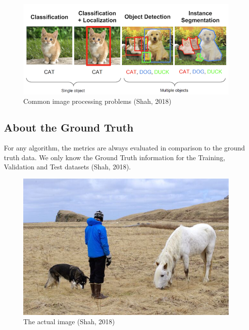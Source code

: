 \documentclass[]{article}
\begin{document}
\begin{figure}[!h]
	\includegraphics[scale=0.65]{obj_det}
	\caption{Common image processing problems (Shah, 2018)}
	\label{Fig:Race}
\end{figure}


\subsection{About the Ground Truth}
For any algorithm, the metrics are always evaluated in comparison to the ground truth data. We only know the Ground Truth information for the Training, Validation and Test datasets (Shah, 2018).
\pagebreak
\begin{figure}[!h]
	\includegraphics[scale=0.65]{ground2}
	\caption{The actual image (Shah, 2018)}
	\label{Fig:Race}
\end{figure}
\end{document}
